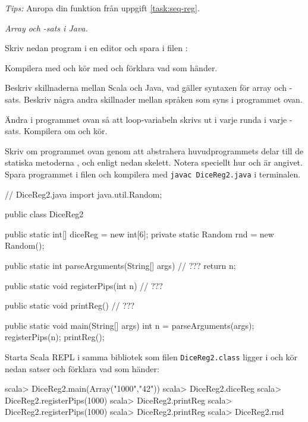 \emph{Tips:}
Anropa din funktion  från uppgift \ref{task:seq-reg}.


\Task \emph{Array och -sats i Java.}

\Subtask Skriv nedan program i en editor och spara i filen :


\Subtask Kompilera med  och kör med  och förklara vad som händer.

\Subtask\Pen Beskriv skillnaderna mellan Scala och Java, vad gäller syntaxen för array och -sats. Beskriv några andra skillnader mellan språken som syns i programmet ovan.

\Subtask Ändra i programmet ovan så att loop-variabeln  skrivs ut i varje runda i varje -sats. Kompilera om och kör.

\Subtask Skriv om programmet ovan genom att abstrahera huvudprogrammets delar till de statiska metoderna ,  och  enligt nedan skelett. Notera speciellt hur  och  är angivet. Spara programmet i filen  och kompilera med \texttt{javac DiceReg2.java} i terminalen.

\begin{Code}[language=Java]
// DiceReg2.java
import java.util.Random;

public class DiceReg2 {
    public static int[] diceReg = new int[6];
    private static Random rnd = new Random();

    public static int parseArguments(String[] args) {
        // ???
        return n;
    }

    public static void registerPips(int n){
        // ???
    }

    public static void printReg() {
        // ???
    }

    public static void main(String[] args) {
        int n = parseArguments(args);
        registerPips(n);
        printReg();
    }
}
\end{Code}

\Subtask Starta Scala REPL i samma bibliotek som filen \texttt{DiceReg2.class} ligger i och kör nedan satser och förklara vad som händer:
\begin{REPL}
scala> DiceReg2.main(Array("1000","42"))
scala> DiceReg2.diceReg
scala> DiceReg2.registerPips(1000)
scala> DiceReg2.printReg
scala> DiceReg2.registerPips(1000)
scala> DiceReg2.printReg
scala> DiceReg2.rnd
\end{REPL}

